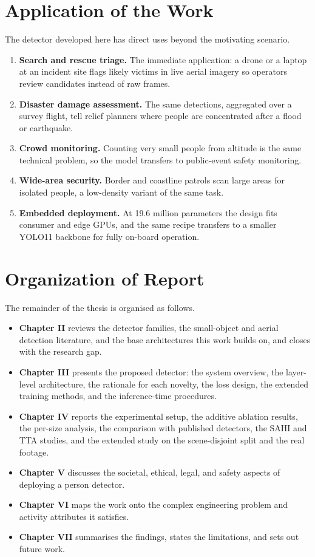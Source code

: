\section{Application of the Work}
The detector developed here has direct uses beyond the motivating scenario.
\begin{enumerate}
  \item \textbf{Search and rescue triage.} The immediate application: a
        drone or a laptop at an incident site flags likely victims in live
        aerial imagery so operators review candidates instead of raw frames.
  \item \textbf{Disaster damage assessment.} The same detections, aggregated
        over a survey flight, tell relief planners where people are
        concentrated after a flood or earthquake.
  \item \textbf{Crowd monitoring.} Counting very small people from altitude
        is the same technical problem, so the model transfers to public-event
        safety monitoring.
  \item \textbf{Wide-area security.} Border and coastline patrols scan large
        areas for isolated people, a low-density variant of the same task.
  \item \textbf{Embedded deployment.} At 19.6 million parameters the design
        fits consumer and edge GPUs, and the same recipe transfers to a
        smaller YOLO11 backbone for fully on-board operation.
\end{enumerate}

\section{Organization of Report}
The remainder of the thesis is organised as follows.
\begin{itemize}
  \item \textbf{Chapter II} reviews the detector families, the small-object
        and aerial detection literature, and the base architectures this work
        builds on, and closes with the research gap.
  \item \textbf{Chapter III} presents the proposed detector: the system
        overview, the layer-level architecture, the rationale for each
        novelty, the loss design, the extended training methods, and the
        inference-time procedures.
  \item \textbf{Chapter IV} reports the experimental setup, the additive
        ablation results, the per-size analysis, the comparison with
        published detectors, the SAHI and TTA studies, and the extended
        study on the scene-disjoint split and the real footage.
  \item \textbf{Chapter V} discusses the societal, ethical, legal, and safety
        aspects of deploying a person detector.
  \item \textbf{Chapter VI} maps the work onto the complex engineering
        problem and activity attributes it satisfies.
  \item \textbf{Chapter VII} summarises the findings, states the limitations,
        and sets out future work.
\end{itemize}
